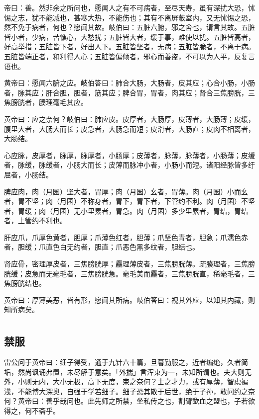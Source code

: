 \documentclass[a4paper,12pt,UTF8,twoside]{ctexbook}
\begin{document}
	帝曰：善。然非余之所问也，愿闻人之有不可病者，至尽天寿，虽有深扰大恐，怵惕之志，犹不能减也，甚寒大热，不能伤也；其有不离屏蔽室内，又无怵惕之恐，然不免于病者，何也？愿闻其故。岐伯曰：五脏六腑，邪之舍也，请言其故。五脏皆小者，少病，苦憔心，大愁扰；五脏皆大者，缓于事，难使以扰。五脏皆高者，好高举措；五脏皆下者，好出人下。五脏皆坚者，无病；五脏皆脆者，不离于病。五脏皆端正者，和利得人心；五脏皆偏倾者，邪心而善盗，不可以为人平，反复言语也。
	
	黄帝曰：愿闻六腑之应。岐伯答曰：肺合大肠，大肠者，皮其应；心合小肠，小肠者，脉其应；肝合胆，胆者，筋其应；脾合胃，胃者，肉其应；肾合三焦膀胱，三焦膀胱者，腠理毫毛其应。
	
	黄帝曰：应之奈何？岐伯曰：肺应皮。皮厚者，大肠厚，皮薄者，大肠薄；皮缓，腹里大者，大肠大而长；皮急者，大肠急而短；皮滑者，大肠直；皮肉不相离者，大肠结。
	
	心应脉，皮厚者，脉厚，脉厚者，小肠厚；皮薄者，脉薄，脉薄者，小肠薄；皮缓者，脉缓，脉缓者，小肠大而长；皮薄而脉冲小者，小肠小而短。诸阳经脉皆多纡屈者，小肠结。
	
	脾应肉，肉（月囷）坚大者，胃厚；肉（月囷）幺者，胃薄。肉（月囷）小而幺者，胃不坚；肉（月囷）不称身者，胃下，胃下者，下管约不利。肉（月囷）不坚者，胃缓；肉（月囷）无小里累者，胃急。肉（月囷）多少里累者，胃结，胃结者，上管约不利也。
	
	肝应爪，爪厚色黄者，胆厚；爪薄色红者，胆薄；爪坚色青者，胆急；爪濡色赤者，胆缓；爪直色白无约者，胆直；爪恶色黑多纹者，胆结也。
	
	肾应骨，密理厚皮者，三焦膀胱厚；麤理薄皮者，三焦膀胱薄。疏腠理者，三焦膀胱缓；皮急而无毫毛者，三焦膀胱急。毫毛美而麤者，三焦膀胱直，稀毫毛者，三焦膀胱结也。
	
	黄帝曰：厚薄美恶，皆有形，愿闻其所病。岐伯答曰：视其外应，以知其内藏，则知所病矣。
	
	\part{}
	\chapter{禁服}
	
	雷公问于黄帝曰：细子得受，通于九针六十篇，旦暮勤服之，近者编绝，久者简垢，然尚讽诵弗置，未尽解于意矣。「外揣」言浑束为一，未知所谓也。夫大则无外，小则无内，大小无极，高下无度，束之奈何？士之才力，或有厚薄，智虑褊浅，不能博大深奥，自强于学若细子。细子恐其散于后世，绝于子孙，敢问约之奈何？黄帝曰：善乎哉问也。此先师之所禁，坐私传之也，割臂歃血之盟也，子若欲得之，何不斋乎。
	
\end{document}
